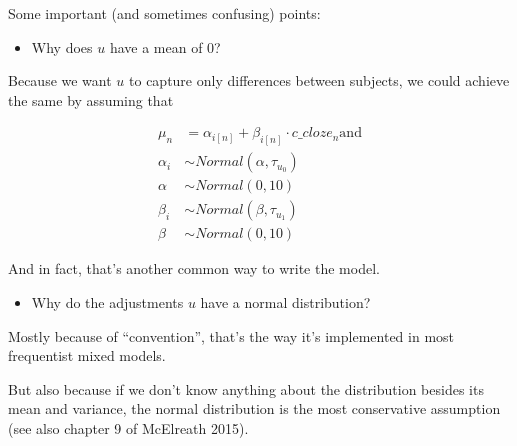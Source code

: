 \documentclass[12pt,ignorenonframetext,aspectratio=169]{beamer}
\providecommand{\tightlist}{%
  \setlength{\itemsep}{0pt}\setlength{\parskip}{0pt}}
\begin{document}
\begin{frame}

Some important (and sometimes confusing) points:

\begin{itemize}
\tightlist
\item
  Why does \(u\) have a mean of 0?
\end{itemize}

Because we want \(u\) to capture only differences between subjects, we could achieve the same by assuming that

\begin{equation}
\begin{aligned}
\mu_n &= \alpha_{i[n]} + \beta_{i[n]} \cdot c\_cloze_n \text{and} \\
\alpha_i &\sim Normal(\alpha,\tau_{u_0})\\
\alpha &\sim Normal(0,10)\\
\beta_i &\sim Normal(\beta,\tau_{u_1})\\
\beta &\sim Normal(0,10)
\end{aligned}
\end{equation}

And in fact, that's another common way to write the model.

\end{frame}

\begin{frame}

\begin{itemize}
\tightlist
\item
  Why do the adjustments \(u\) have a normal distribution?
\end{itemize}

Mostly because of ``convention'', that's the way it's implemented in most frequentist mixed models.

But also because if we don't know anything about the distribution besides its mean and variance, the normal distribution is the most conservative assumption (see also chapter 9 of McElreath 2015).

\end{frame}
\end{document}
